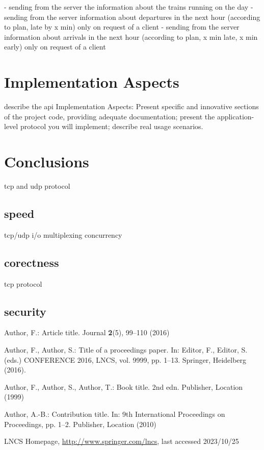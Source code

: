 \documentclass[runningheads]{llncs}
\begin{document}
- sending from the server the information about the trains running on the day
- sending from the server information about departures in the next hour (according to plan, late by x min) only on request of a client
- sending from the server information about arrivals in the next hour (according to plan, x min late, x min early) only on request of a client

\section{Implementation Aspects}

describe the api
Implementation Aspects: Present specific and innovative sections of the project code, providing adequate documentation; present the application-level protocol you will implement; describe real usage scenarios.

\section{Conclusions}

tcp and udp protocol


\subsection{speed}

tcp/udp
i/o multiplexing
concurrency

\subsection{corectness}

tcp protocol

\subsection{security}


% 
% 

\begin{thebibliography}{8}
Author, F.: Article title. Journal \textbf{2}(5), 99--110 (2016)

Author, F., Author, S.: Title of a proceedings paper. In: Editor,
F., Editor, S. (eds.) CONFERENCE 2016, LNCS, vol. 9999, pp. 1--13.
Springer, Heidelberg (2016). 

Author, F., Author, S., Author, T.: Book title. 2nd edn. Publisher,
Location (1999)

Author, A.-B.: Contribution title. In: 9th International Proceedings
on Proceedings, pp. 1--2. Publisher, Location (2010)

LNCS Homepage, \url{http://www.springer.com/lncs}, last accessed 2023/10/25
\end{thebibliography}
\end{document}
